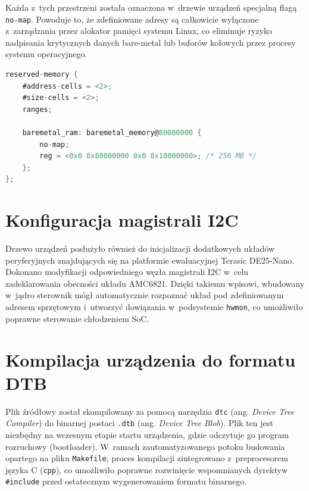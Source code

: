 Każda z~tych przestrzeni została oznaczona w~drzewie urządzeń specjalną flagą \texttt{no-map}. Powoduje to, że zdefiniowane adresy są całkowicie wyłączone z~zarządzania przez alokator pamięci systemu Linux, co eliminuje ryzyko nadpisania krytycznych danych bare-metal lub buforów kołowych przez procesy systemu operacyjnego.

\begin{lstlisting}[language=C, caption={Przykładowy fragment deklaracji przestrzeni reserved-memory}, label={lst:dts_mem}]
reserved-memory {
    #address-cells = <2>;
    #size-cells = <2>;
    ranges;

    baremetal_ram: baremetal_memory@80000000 {
        no-map;
        reg = <0x0 0x80000000 0x0 0x10000000>; /* 256 MB */
    };
};
\end{lstlisting}

\section{Konfiguracja magistrali I2C}
Drzewo urządzeń posłużyło również do inicjalizacji dodatkowych układów peryferyjnych znajdujących się na platformie ewaluacyjnej Terasic DE25-Nano. Dokonano modyfikacji odpowiedniego węzła magistrali I2C w~celu zadeklarowania obecności układu AMC6821. Dzięki takiemu wpisowi, wbudowany w~jądro sterownik mógł automatycznie rozpoznać układ pod zdefiniowanym adresem sprzętowym i~utworzyć dowiązania w~podsystemie \texttt{hwmon}, co umożliwiło poprawne sterowanie chłodzeniem SoC.

\section{Kompilacja urządzenia do formatu DTB}
Plik źródłowy został skompilowany za pomocą narzędzia \texttt{dtc} (ang. \textit{Device Tree Compiler}) do binarnej postaci \texttt{.dtb} (ang. \textit{Device Tree Blob}). Plik ten jest niezbędny na wczesnym etapie startu urządzenia, gdzie odczytuje go program rozruchowy (bootloader). W~ramach zautomatyzowanego potoku budowania opartego na pliku \texttt{Makefile}, proces kompilacji zintegrowano z~preprocesorem języka C (\texttt{cpp}), co umożliwiło poprawne rozwinięcie wspomnianych dyrektyw \texttt{\#include} przed ostatecznym wygenerowaniem formatu binarnego.